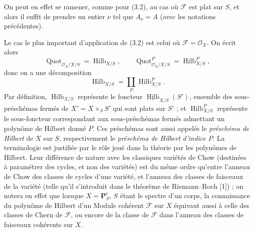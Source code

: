 On peut en effet se ramener, comme pour (3.2), au cas où $\mathcal F$ est plat
sur $S$, et alors il suffit de prendre un entier $\nu$ tel que $A_\nu=A$ (avec
les notations précédentes).

Le cas le plus important d'application de (3.2) est celui où
$\mathcal F=\mathcal O_X$. On écrit alors
\[
\operatorname{Quot}_{\mathcal O_X/X/S}=\operatorname{Hilb}_{X/S},
\qquad
\operatorname{Quot}^P_{\mathcal O_X/X/S}=\operatorname{Hilb}^P_{X/S},
\]
donc on a une décomposition
\[
\operatorname{Hilb}_{X/S}=\coprod_P\operatorname{Hilb}^P_{X/S}.
\]
Par définition, $\operatorname{Hilb}_{X/S}$ représente le foncteur
$\underline{\operatorname{Hilb}}_{X/S}(S')$, ensemble des sous-préschémas
fermés de $X'=X\times_SS'$ qui sont plats sur $S'$ ; et
$\operatorname{Hilb}^P_{X/S}$ représente le sous-foncteur correspondant aux
sous-préschémas fermés admettant un polynôme de Hilbert donné $P$. Ces
préschémas sont aussi appelés le \emph{préschéma de Hilbert} de $X$ sur $S$,
respectivement le \emph{préschéma de Hilbert d'indice $P$}. La terminologie est
justifiée par le rôle joué dans la théorie par les polynômes de Hilbert. Leur
différence de nature avec les classiques variétés de Chow (destinées à
paramétrer des cycles, et non des variétés) est du même ordre qu'entre
l'anneau de Chow des classes de cycles d'une variété, et l'anneau des classes
de faisceaux de la variété (telle qu'il s'introduit dans le théorème de
Riemann--Roch [1]) ; on notera en effet que lorsque $X=\mathbf P^r_S$, $S$
étant le spectre d'un corps, la connaissance du polynôme de Hilbert d'un Module
cohérent $\mathcal F$ sur $X$ équivaut aussi à celle des classes de Chern de
$\mathcal F$, ou encore de la classe de $\mathcal F$ dans l'anneau des classes
de faisceaux cohérents sur $X$.

